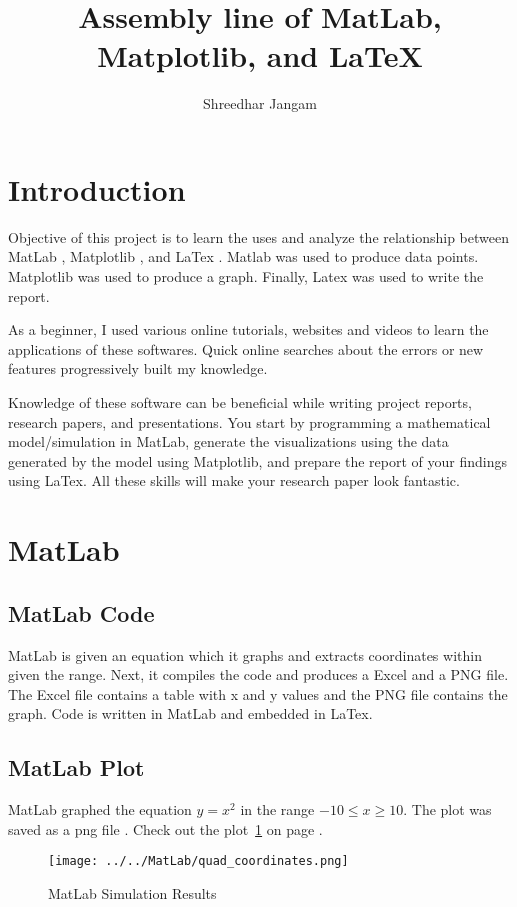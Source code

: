 \documentclass{article}
\begin{document}
\title{Assembly line of MatLab, Matplotlib, and \LaTeX{}}
\author{Shreedhar Jangam}

\maketitle

\section{Introduction}
	Objective of this project is to learn the uses and analyze the relationship between MatLab \cite{matlabtool}, Matplotlib \cite{matplotlibtool}, and LaTex \cite{latextool}. Matlab was used to produce data points. Matplotlib was used to produce a graph. Finally, Latex was used to write the report.\par 
	As a beginner, I used various online tutorials, websites and videos to learn the applications of these softwares. Quick online searches about the errors or new features progressively built my knowledge.\par
	Knowledge of these software can be beneficial while writing project reports, research papers, and presentations. You start by programming a mathematical model/simulation in MatLab, generate the visualizations using the data generated by the model using Matplotlib, and prepare the report of  your findings using LaTex. All these skills will make your research paper look fantastic.

\section{MatLab}
\subsection{MatLab Code}
MatLab is given an equation which it graphs and extracts coordinates within given the range. Next, it compiles the code and produces a Excel and a PNG file. The Excel file contains a table with x and y values and the PNG file contains the graph. Code is written in MatLab and embedded in LaTex\cite{matlabvid}. 



\subsection{MatLab Plot}
MatLab graphed the equation \(y = x^2\) in the range $-10 \leq x \geq 10$. The plot was saved as a png file \cite{matlabcode}. Check out the plot~\ref{fig:matlabfigure} on page \pageref{fig:matlabfigure}. 
\begin{figure}[h]
    \centering
   \texttt{[image: ../../MatLab/quad\_coordinates.png]} 
    \caption{MatLab Simulation Results}
    \label{fig:matlabfigure}
\end{figure}
\end{document}
